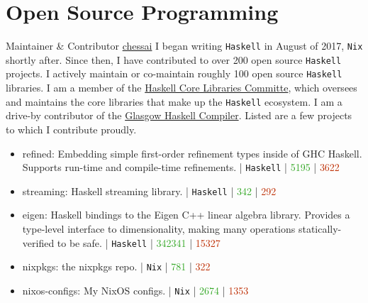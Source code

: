 \documentclass[10pt,letterpaper,sans]{moderncv}
\newcommand{\wlink}[2]{\textcolor[HTML]{461645}{\href{#1}{#2}}}
\newcommand{\ghlink}[2]{\wlink{https://github.com/#1}{#2}}
\newcommand{\ghrepo}[1]{\ghlink{#1}{\faGithub}}
\newcommand{\ghlang}[1]{\texttt{#1}}
\newcommand{\ghadd}[1]{\textcolor[HTML]{30A622}{{\faPlusCircle} #1}}
\newcommand{\ghrem}[1]{\textcolor[HTML]{BD2C00}{{\faMinusCircle} #1}}
\newcommand{\ghub}[4]{\ghrepo{#2} | \ghlang{#1} | \ghadd{#3} | \ghrem{#4}}
\newcommand{\lang}[1]{\texttt{#1}}
\begin{document}

\section{Open Source Programming}
  {Maintainer \& Contributor}
  {\wlink{https://github.com/chessai}{chessai}}
  {\newline I began writing \lang{Haskell} in August of 2017, \lang{Nix} shortly after. Since then, I have contributed to over 200 open source \lang{Haskell} projects. I actively maintain or co-maintain roughly 100 open source \lang{Haskell} libraries. I am a member of the \wlink{https://wiki.haskell.org/Core_Libraries_Committee}{Haskell Core Libraries Committe}, which oversees and maintains the core libraries that make up the \lang{Haskell} ecosystem. I am a drive-by contributor of the \wlink{https://www.haskell.org/ghc/}{Glasgow Haskell Compiler}. Listed are a few projects to which I contribute proudly.
  }
  {}
  {
\begin{itemize}
  \item refined: Embedding simple first-order refinement types inside of GHC Haskell. Supports run-time and compile-time refinements. \newline \ghub{Haskell}{chessai/refined}{5195}{3622}
  \item streaming: Haskell streaming library. \newline \ghub{Haskell}{haskell-streaming/streaming}{342}{292}
  \item eigen: Haskell bindings to the Eigen C++ linear algebra library. Provides a type-level interface to dimensionality, making many operations statically-verified to be safe. \newline \ghub{Haskell}{chessai/eigen}{342341}{15327}
  \item nixpkgs: the nixpkgs repo. \newline \ghub{Nix}{NixOS/nixpkgs}{781}{322}
  \item nixos-configs: My NixOS configs. \newline \ghub{Nix}{chessai/nixos-configs}{2674}{1353}
\end{itemize}
}
\end{document}
